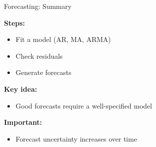 \documentclass[aspectratio=169]{beamer}
\begin{document}
\begin{frame}{Forecasting: Summary}

\textbf{Steps:}
\begin{itemize}
    \item Fit a model (AR, MA, ARMA)
    \item Check residuals
    \item Generate forecasts
\end{itemize}

\vspace{0.4cm}

\textbf{Key idea:}
\begin{itemize}
    \item Good forecasts require a well-specified model
\end{itemize}

\vspace{0.4cm}

\textbf{Important:}
\begin{itemize}
    \item Forecast uncertainty increases over time
\end{itemize}

\end{frame}
\end{document}
